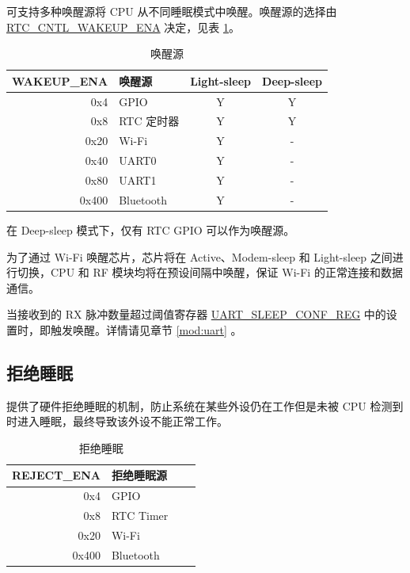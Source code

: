 \documentclass[main\_\_CN.tex]{subfiles}
\begin{document}
\chipname{} 可支持多种唤醒源将 CPU 从不同睡眠模式中唤醒。唤醒源的选择由 \hyperref[fielddesc:RTCCNTLWAKEUPENA]{RTC\_CNTL\_WAKEUP\_ENA} 决定，见表 \ref{tab:lpm-wakeup-source}。

\begin{table}[H]
    \centering
    \caption{唤醒源}
    \label{tab:lpm-wakeup-source}
    \begin{threeparttable}
    \begin{tabular}{| r | l | c | c |}
    \hline
    \rowcolor{lightgray}
    \textbf{WAKEUP\_ENA} & \textbf{唤醒源} &  \textbf{Light-sleep} & \textbf{Deep-sleep}  \\\hline
    0x4 & GPIO\tnote{1} & Y & Y \\\hline
    0x8 & RTC 定时器 & Y & Y \\\hline
    0x20 & Wi-Fi\tnote{2} & Y & - \\\hline
    0x40 & UART0\tnote{3} & Y & - \\\hline
    0x80 & UART1\tnote{3} & Y & - \\\hline
    0x400 & Bluetooth & Y & - \\\hline
    \end{tabular}
    \begin{tablenotes}
        \item[1] 在 Deep-sleep 模式下，仅有 RTC GPIO 可以作为唤醒源。
        \item[2] 为了通过 Wi-Fi 唤醒芯片，芯片将在 Active、Modem-sleep 和 Light-sleep 之间进行切换，CPU 和 RF 模块均将在预设间隔中唤醒，保证 Wi-Fi 的正常连接和数据通信。
        \item[3] 当接收到的 RX 脉冲数量超过阈值寄存器 \hyperref[regdesc:UARTSLEEPCONFREG]{UART\_SLEEP\_CONF\_REG} 中的设置时，即触发唤醒。详情请见章节 \ref{mod:uart} \textit{}。
    \end{tablenotes}
    \end{threeparttable}
\end{table}

\subsection{拒绝睡眠}\label{sec:lpm-reject-source}

\chipname{} 提供了硬件拒绝睡眠的机制，防止系统在某些外设仍在工作但是未被 CPU 检测到时进入睡眠，最终导致该外设不能正常工作。

\begin{table}[H]
    \centering
    \caption{拒绝睡眠}
    \label{tab:lpm-reject-source}
    \begin{threeparttable}
    \begin{tabular}{| r | l | c | c |}
    \hline
    \rowcolor{lightgray}
    \textbf{REJECT\_ENA} & \textbf{拒绝睡眠源}  \\\hline
    0x4 & GPIO \\\hline
    0x8 & RTC Timer \\\hline
    0x20 & Wi-Fi\\\hline
    0x400 & Bluetooth\\\hline
    \end{tabular}
    \end{threeparttable}
\end{table}
\end{document}
